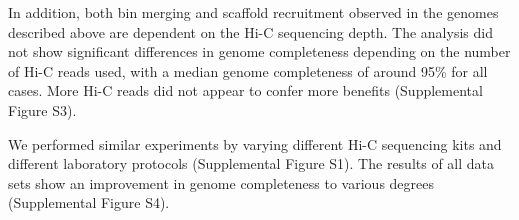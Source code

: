\documentclass[fleqn,10pt,lineno]{wlpeerj}
\begin{document}
In addition, both bin merging and scaffold recruitment observed in the genomes described above are dependent on the Hi-C sequencing depth. The analysis did not show significant differences in genome completeness depending on the number of Hi-C reads used, with a median genome completeness of around 95\% for all cases.  
More Hi-C reads did not appear to confer more benefits (Supplemental Figure S3).   

We performed similar experiments by varying different Hi-C sequencing kits and different laboratory protocols (Supplemental Figure S1). The results of all data sets show an improvement in genome completeness to various degrees (Supplemental Figure S4). 
\end{document}
